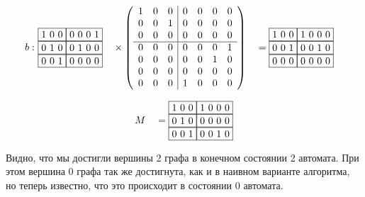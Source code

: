 \begin{alignat*}{7}
  b:\,\,
  & \begin{matrix}
    \fbox{1 0 0} \fbox{0 0 0 1} \\ 
    \fbox{0 1 0} \fbox{0 1 0 0} \\
    \fbox{0 0 1} \fbox{0 0 0 0}
      \end{matrix}  &&
      \times
      \left(\begin{array}{c c c | c c c c}
      1 & 0 & 0 & 0 & 0 & 0 & 0 \\
      0 & 0 & 1 & 0 & 0 & 0 & 0 \\
      0 & 0 & 0 & 0 & 0 & 0 & 0 \\
      \hline
      0 & 0 & 0 & 0 & 0 & 0 & 1 \\
      0 & 0 & 0 & 0 & 0 & 1 & 0 \\
      0 & 0 & 0 & 0 & 0 & 0 & 0 \\
      0 & 0 & 0 & 1 & 0 & 0 & 0 
      \end{array}\right)
      &&= \begin{matrix}
        \fbox{1 0 0} \fbox{1 0 0 0} \\ 
        \fbox{0 0 1} \fbox{0 0 1 0} \\
        \fbox{0 0 0} \fbox{0 0 0 0}
    \end{matrix}
\end{alignat*}

\begin{alignat*}{7}
  & &&M &&=\begin{matrix}
    \fbox{1 0 0} \fbox{1 0 0 0} \\ 
    \fbox{0 1 0} \fbox{0 0 0 0} \\
    \fbox{0 0 1} \fbox{0 0 1 0}
        \end{matrix}
\end{alignat*}

Видно, что мы достигли вершины 2 графа в конечном состоянии 2 автомата. При этом вершина 0 графа так же достигнута, как и в наивном варианте алгоритма, но
теперь известно, что это происходит в состоянии 0 автомата.

